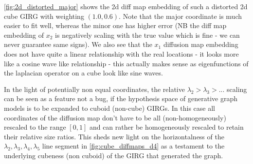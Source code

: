 \cref{fig:2d_distorted_major} shows the 2d diff map embedding of such a distorted 2d cube GIRG with weighting $(1.0, 0.6)$. Note that the major coordinate is much easier to fit well, whereas the minor one has higher error (NB the diff map embedding of $x_2$ is negatively scaling with the true value which is fine - we can never guarantee same signs).
We also see that the $x_1$ diffusion map embedding does not have quite a linear relationship with the real locations - it looks more like a cosine wave like relationship - this actually makes sense as eigenfunctions of the laplacian operator on a cube look like sine waves.


In the light of potentially non equal coordinates, the relative $\lambda_2 > \lambda_3 > ...$ scaling can be seen as a feature not a bug, if the hypothesis space of generative graph models is to be expanded to cuboid (non-cube) GIRGs. In this case all coordinates of the diffusion map don't have to be all (non-homogeneously) rescaled to the range $[0, 1]$ and can rather be homogeneously rescaled to retain their relative size ratios.
This sheds new light on the horizontalness of the $\lambda_2, \lambda_3, \lambda_4, \lambda_5$ line segment in \cref{fig:cube_diffmaps_d4} as a testament to the underlying cubeness (non cuboid) of the GIRG that generated the graph.








